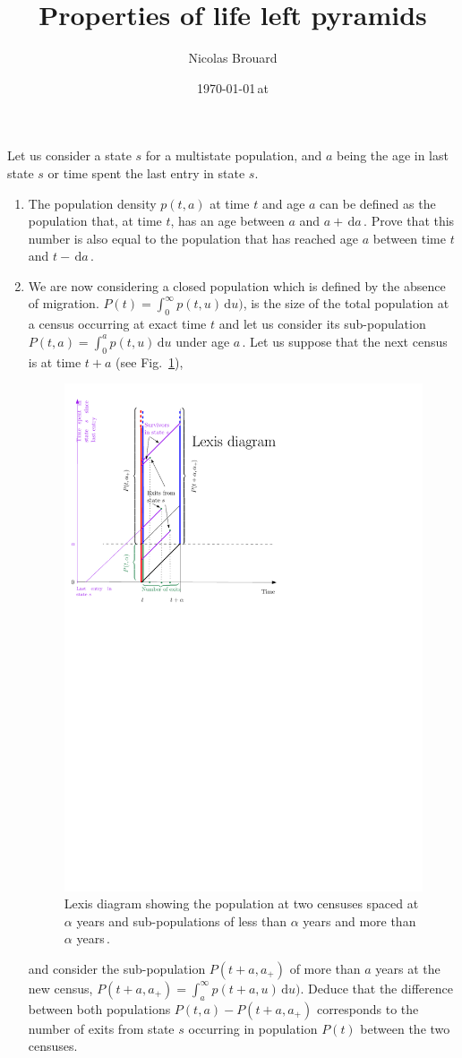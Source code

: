 \documentclass[11pt,a4paper]{article}
\title{Properties of life left pyramids}
\author{Nicolas Brouard}
\date{\today \,at \currenttime}
\def\D{{\,\mathrm d}}
\begin{document}
 \maketitle

Let us consider a state $s$ for a multistate population, and $a$ being the age in last state $s$ or time spent the last entry in state $s$. 
\begin{enumerate}
\item  The population density $p(t,a)$ at time $t$ and age $a$ can be
  defined as the population that, at time $t$, has an age between $a$
  and $a + \D a$\,. Prove that this number is also equal to the
  population that has reached age $a$ between time $t$ and
  $t-\D a$\,\citep{Brouard-Iford-Mouvements}.  
\item We are now considering a closed population which is defined by
  the absence of migration.  $P(t)=\int_0^∞ p(t,u) \D u)$, is the size
  of the total population at a census occurring at exact time $t$ and
  let us consider its sub-population $P(t,a)=\int_0^a p(t,u)\D u$
  under age $a$\,.  Let us suppose that the next census is at time
  $t+a$ (see Fig.~\ref{f:life-left-stable-multi-lexis-ipe}),
 \begin{figure}[htbp]\centering
   \includegraphics[width=.8\textwidth]{life-left-stable-multi-lexis-ipe}
   \caption{\sf Lexis diagram showing the population at two censuses
     spaced at $\alpha$ years and sub-populations of less than $\alpha$
     years and more than $\alpha$ years\,.}\label{f:life-left-stable-multi-lexis-ipe}
 \end{figure}
 and consider the sub-population $P(t+a, a_+)$ of more than $a$ years
 at the new census, $P(t+a, a_+)=\int_a^∞ p(t+a,u) \D u)$. Deduce that
 the difference between both populations $P(t,a)-P(t+a, a_+)$
 corresponds to the number of exits from state $s$ occurring in
 population $P(t)$ between the two censuses.


\end{enumerate}
\end{document}
